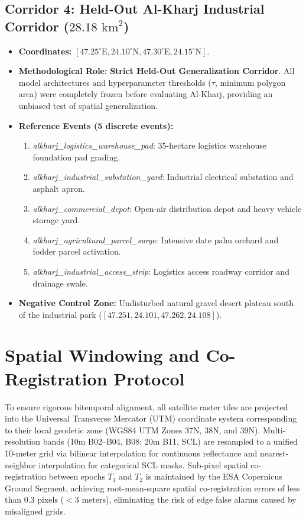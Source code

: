 \subsection{Corridor 4: Held-Out Al-Kharj Industrial Corridor ($28.18\text{ km}^2$)}
\begin{itemize}
    \item \textbf{Coordinates:} $[47.25^\circ\text{E}, 24.10^\circ\text{N}, 47.30^\circ\text{E}, 24.15^\circ\text{N}]$.
    \item \textbf{Methodological Role:} \textbf{Strict Held-Out Generalization Corridor}. All model architectures and hyperparameter thresholds ($\tau$, minimum polygon area) were completely frozen before evaluating Al-Kharj, providing an unbiased test of spatial generalization.
    \item \textbf{Reference Events (5 discrete events):}
    \begin{enumerate}
        \item \textit{alkharj\_logistics\_warehouse\_pad}: 35-hectare logistics warehouse foundation pad grading.
        \item \textit{alkharj\_industrial\_substation\_yard}: Industrial electrical substation and asphalt apron.
        \item \textit{alkharj\_commercial\_depot}: Open-air distribution depot and heavy vehicle storage yard.
        \item \textit{alkharj\_agricultural\_parcel\_surge}: Intensive date palm orchard and fodder parcel activation.
        \item \textit{alkharj\_industrial\_access\_strip}: Logistics access roadway corridor and drainage swale.
    \end{enumerate}
    \item \textbf{Negative Control Zone:} Undisturbed natural gravel desert plateau south of the industrial park ($[47.251, 24.101, 47.262, 24.108]$).
\end{itemize}

\section{Spatial Windowing and Co-Registration Protocol}
\label{sec:data_coregistration}
To ensure rigorous bitemporal alignment, all satellite raster tiles are projected into the Universal Transverse Mercator (UTM) coordinate system corresponding to their local geodetic zone (WGS84 UTM Zones 37N, 38N, and 39N). Multi-resolution bands (10m B02--B04, B08; 20m B11, SCL) are resampled to a unified 10-meter grid via bilinear interpolation for continuous reflectance and nearest-neighbor interpolation for categorical SCL masks. Sub-pixel spatial co-registration between epochs $T_1$ and $T_2$ is maintained by the ESA Copernicus Ground Segment, achieving root-mean-square spatial co-registration errors of less than $0.3\text{ pixels}$ ($<3\text{ meters}$), eliminating the risk of edge false alarms caused by misaligned grids.
\newpage
